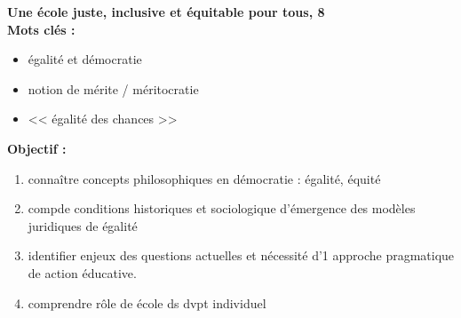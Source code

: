 \documentclass[12pt]{article}
\begin{document}
\textbf{Une école juste, inclusive et équitable pour tous, 8} \\

\textbf{Mots clés : }
\begin{itemize}
\item égalité et démocratie
\item notion de mérite / méritocratie
\item << égalité des chances >>
\end{itemize}

\vspace{0.5cm}

\textbf{Objectif :}


\begin{enumerate}
\item connaître concepts philosophiques en démocratie : égalité, équité
\item compde conditions historiques et sociologique d'émergence des modèles juridiques de égalité
\item identifier enjeux des questions actuelles et nécessité d'1 approche pragmatique de action éducative.
\item comprendre rôle de école ds dvpt individuel \\
\end{enumerate}
\end{document}

